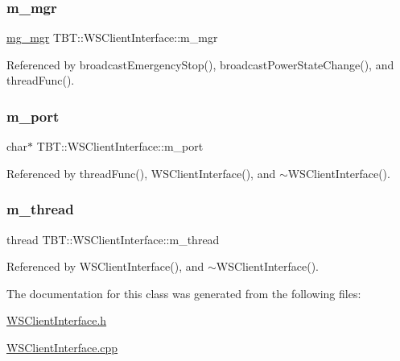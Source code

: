 \subsubsection{\texorpdfstring{m\+\_\+mgr}{m\_mgr}}
{\footnotesize\ttfamily \hyperlink{structmg__mgr}{mg\+\_\+mgr} T\+B\+T\+::\+W\+S\+Client\+Interface\+::m\+\_\+mgr\hspace{0.3cm}{\ttfamily [protected]}}



Referenced by broadcast\+Emergency\+Stop(), broadcast\+Power\+State\+Change(), and thread\+Func().

\mbox{\label{classTBT_1_1WSClientInterface_a5a2b51f344e17b5f3e9b1f3e861b6efe_a5a2b51f344e17b5f3e9b1f3e861b6efe}} 
\subsubsection{\texorpdfstring{m\+\_\+port}{m\_port}}
{\footnotesize\ttfamily char$\ast$ T\+B\+T\+::\+W\+S\+Client\+Interface\+::m\+\_\+port\hspace{0.3cm}{\ttfamily [protected]}}



Referenced by thread\+Func(), W\+S\+Client\+Interface(), and $\sim$\+W\+S\+Client\+Interface().

\mbox{\label{classTBT_1_1WSClientInterface_af8db3d6b3e3923b0b61f43cbc2021a92_af8db3d6b3e3923b0b61f43cbc2021a92}} 
\subsubsection{\texorpdfstring{m\+\_\+thread}{m\_thread}}
{\footnotesize\ttfamily thread T\+B\+T\+::\+W\+S\+Client\+Interface\+::m\+\_\+thread\hspace{0.3cm}{\ttfamily [protected]}}



Referenced by W\+S\+Client\+Interface(), and $\sim$\+W\+S\+Client\+Interface().



The documentation for this class was generated from the following files\+:\begin{DoxyCompactItemize}
\item 
\hyperlink{WSClientInterface_8h}{W\+S\+Client\+Interface.\+h}\item 
\hyperlink{WSClientInterface_8cpp}{W\+S\+Client\+Interface.\+cpp}\end{DoxyCompactItemize}
